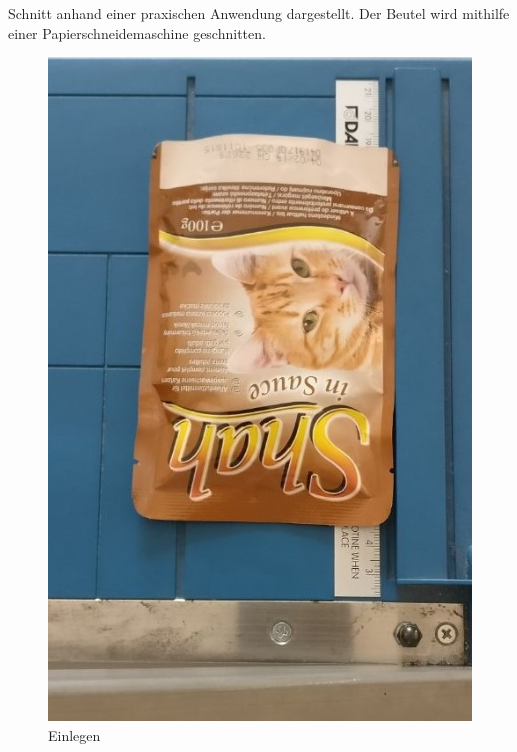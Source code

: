 Schnitt anhand einer praxischen Anwendung dargestellt. Der Beutel wird mithilfe einer Papierschneidemaschine geschnitten.

\begin{figure}[H]
   \begin{minipage}[hbt]{.3\linewidth} %
      \includegraphics[width=\linewidth]{Bilder/Schneideversuch_1.Art/Einlegen}
      \caption{Einlegen}
   \end{minipage}
   \hspace{.2\linewidth}%
   \begin{minipage}[hbt]{.5\linewidth} %

\end{minipage}
\end{figure}
